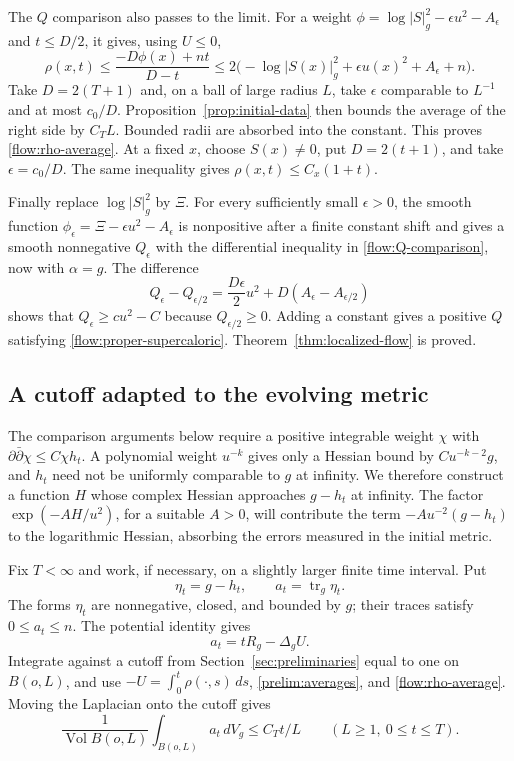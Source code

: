 \documentclass[11pt]{article}
\theoremstyle{definition}
\theoremstyle{remark}
\newcommand{\dd}{\partial\bar\partial}
\DeclareMathOperator{\tr}{tr}
\DeclareMathOperator{\Vol}{Vol}
\numberwithin{equation}{section}
\begin{document}
The $Q$ comparison also passes to the limit.  For a weight
$\phi=\log|S|_g^2-\epsilon u^2-A_\epsilon$ and $t\le D/2$, it gives,
using $U\le0$,
\begin{equation}\label{flow:rho-pointwise}
 \rho(x,t)\le
 \frac{-D\phi(x)+nt}{D-t}
 \le2\bigl(-\log|S(x)|_g^2+\epsilon u(x)^2+A_\epsilon+n\bigr).
\end{equation}
Take $D=2(T+1)$ and, on a ball of large radius $L$, take
$\epsilon$ comparable to $L^{-1}$ and at most $c_0/D$.
Proposition~\ref{prop:initial-data} then bounds the average of the
right side by $C_TL$.  Bounded radii are absorbed into the constant.
This proves \eqref{flow:rho-average}.  At a fixed $x$, choose $S(x)\ne0$,
put $D=2(t+1)$, and take $\epsilon=c_0/D$.  The same inequality gives
$\rho(x,t)\le C_x(1+t)$.

Finally replace $\log|S|_g^2$ by $\Xi$.  For every sufficiently small
$\epsilon>0$, the smooth function
$\phi_\epsilon=\Xi-\epsilon u^2-A_\epsilon$ is nonpositive after
a finite constant shift and gives a smooth nonnegative $Q_\epsilon$
with the differential inequality in \eqref{flow:Q-comparison}, now
with $\alpha=g$.  The difference
\[
 Q_\epsilon-Q_{\epsilon/2}
 =\frac{D\epsilon}{2}u^2+D(A_\epsilon-A_{\epsilon/2})
\]
shows that $Q_\epsilon\ge c u^2-C$ because
$Q_{\epsilon/2}\ge0$.  Adding a constant gives a positive $Q$
satisfying \eqref{flow:proper-supercaloric}.  Theorem~\ref{thm:localized-flow}
is proved.

\subsection{A cutoff adapted to the evolving metric}

The comparison arguments below require a positive integrable weight
$\chi$ with $\dd\chi\le C\chi h_t$.  A polynomial weight $u^{-k}$
gives only a Hessian bound by $Cu^{-k-2}g$, and $h_t$ need not be
uniformly comparable to $g$ at infinity.  We therefore construct a
function $H$ whose complex Hessian approaches $g-h_t$ at infinity.
The factor $\exp(-AH/u^2)$, for a suitable $A>0$, will contribute
the term $-Au^{-2}(g-h_t)$ to the logarithmic Hessian, absorbing
the errors measured in the initial metric.

Fix $T<\infty$ and work, if necessary, on a slightly larger finite
time interval.  Put
\[
 \eta_t=g-h_t,
 \qquad a_t=\tr_g\eta_t.
\]
The forms $\eta_t$ are nonnegative, closed, and bounded by $g$;
their traces satisfy $0\le a_t\le n$.
The potential identity gives
\[
 a_t=tR_g-\Delta_gU.
\]
Integrate against a cutoff from Section~\ref{sec:preliminaries} equal
to one on $B(o,L)$, and use
$-U=\int_0^t\rho(\cdot,s)\,ds$,
\eqref{prelim:averages}, and \eqref{flow:rho-average}.  Moving the
Laplacian onto the cutoff gives
\begin{equation}\label{flow:eta-average}
 \frac{1}{\Vol B(o,L)}\int_{B(o,L)}a_t\,dV_g
 \le C_Tt/L\qquad(L\ge1,\ 0\le t\le T).
\end{equation}
\end{document}
